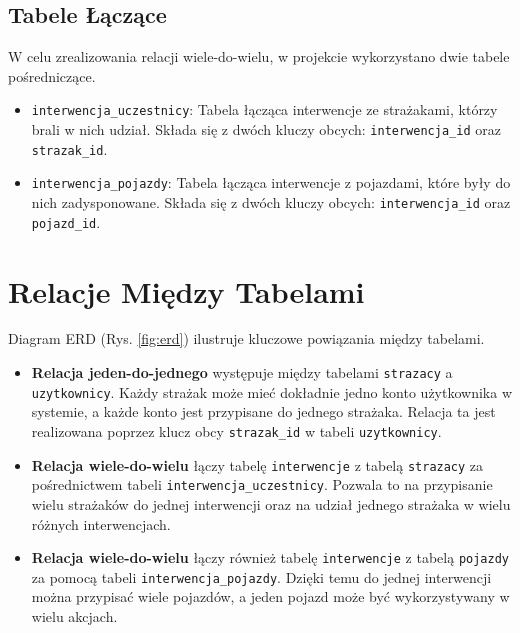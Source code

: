 \subsection{Tabele Łączące}
W celu zrealizowania relacji wiele-do-wielu, w projekcie wykorzystano dwie tabele pośredniczące.
\begin{itemize}
    \item \texttt{interwencja\_uczestnicy}: Tabela łącząca interwencje ze strażakami, którzy brali w nich udział. Składa się z dwóch kluczy obcych: \texttt{interwencja\_id} oraz \texttt{strazak\_id}.
    \item \texttt{interwencja\_pojazdy}: Tabela łącząca interwencje z pojazdami, które były do nich zadysponowane. Składa się z dwóch kluczy obcych: \texttt{interwencja\_id} oraz \texttt{pojazd\_id}.
\end{itemize}

\section{Relacje Między Tabelami}
\label{sec:relacje_tabel}

Diagram ERD (Rys. \ref{fig:erd}) ilustruje kluczowe powiązania między tabelami.
\begin{itemize}
    \item \textbf{Relacja jeden-do-jednego} występuje między tabelami \texttt{strazacy} a \texttt{uzytkownicy}. Każdy strażak może mieć dokładnie jedno konto użytkownika w systemie, a każde konto jest przypisane do jednego strażaka. Relacja ta jest realizowana poprzez klucz obcy \texttt{strazak\_id} w tabeli \texttt{uzytkownicy}.
    \item \textbf{Relacja wiele-do-wielu} łączy tabelę \texttt{interwencje} z tabelą \texttt{strazacy} za pośrednictwem tabeli \texttt{interwencja\_uczestnicy}. Pozwala to na przypisanie wielu strażaków do jednej interwencji oraz na udział jednego strażaka w wielu różnych interwencjach.
    \item \textbf{Relacja wiele-do-wielu} łączy również tabelę \texttt{interwencje} z tabelą \texttt{pojazdy} za pomocą tabeli \texttt{interwencja\_pojazdy}. Dzięki temu do jednej interwencji można przypisać wiele pojazdów, a jeden pojazd może być wykorzystywany w wielu akcjach.
\end{itemize}
